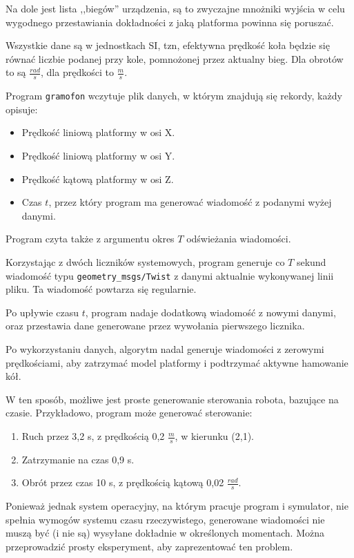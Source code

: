 		Na dole jest lista ,,biegów'' urządzenia, są to zwyczajne mnożniki wyjścia w celu wygodnego przestawiania dokładności z jaką platforma powinna się poruszać.
		
		Wszystkie dane są w jednostkach SI, tzn, efektywna prędkość koła będzie się równać liczbie podanej przy kole, pomnożonej przez aktualny bieg.
		Dla obrotów to są $\frac{rad}{s}$, dla prędkości to $\frac{m}{s}$.
		
	Program \texttt{gramofon} wczytuje plik danych, w którym znajdują się rekordy, każdy opisuje:
	\begin{itemize}
		\item Prędkość liniową platformy w osi X.
		\item Prędkość liniową platformy w osi Y.
		\item Prędkość kątową platformy w osi Z.
		\item Czas $t$, przez który program ma generować wiadomość z podanymi wyżej danymi.
	\end{itemize}
	Program czyta także z argumentu okres $T$ odświeżania wiadomości.
	
	Korzystając z dwóch liczników systemowych, program generuje co $T$ sekund wiadomość typu \texttt{geometry\_msgs/Twist} z danymi aktualnie wykonywanej linii pliku.
	Ta wiadomość powtarza się regularnie.
	
	Po upływie czasu $t$, program nadaje dodatkową wiadomość z nowymi danymi, oraz przestawia dane generowane przez wywołania pierwszego licznika.
	
	Po wykorzystaniu danych, algorytm nadal generuje wiadomości z zerowymi prędkościami, aby zatrzymać model platformy i podtrzymać aktywne hamowanie kół.
	
	W ten sposób, możliwe jest proste generowanie sterowania robota, bazujące na czasie.
	Przykładowo, program może generować sterowanie:
	\begin{enumerate}
		\item Ruch przez 3,2 s, z prędkością 0,2 $\frac{m}{s}$, w kierunku (2,1).
		\item Zatrzymanie na czas 0,9 s.
		\item Obrót przez czas 10 s, z prędkością kątową 0,02 $\frac{rad}{s}$.
	\end{enumerate}
	
	Ponieważ jednak system operacyjny, na którym pracuje program i symulator, nie spełnia wymogów systemu czasu rzeczywistego, generowane wiadomości
	nie muszą być (i nie są) wysyłane dokładnie w określonych momentach. Można przeprowadzić prosty eksperyment, aby zaprezentować ten problem.
	
